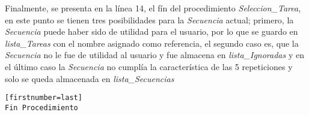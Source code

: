 Finalmente, se presenta en la l\'inea 14, el f\'in del procedimiento
 \emph{Seleccion\_Tarea}, en este punto se tienen tres posibilidades para la 
 \emph{Secuencia} actual; primero, la \emph{Secuencia} puede haber sido de 
 utilidad para el usuario, por lo que se guardo en \emph{lista\_Tareas} con el 
 nombre asignado como referencia, el segundo caso es, que la \emph{Secuencia} 
 no le fue de utilidad al usuario y fue almacena en \emph{lista\_Ignoradas} y 
 en el \'ultimo caso la \emph{Secuencia} no cumpl\'ia la caracter\'istica de 
 las 5 repeticiones y solo se queda almacenada en \emph{lista\_Secuencias}  

\begin{tiny}
\begin{lstlisting}[name=EXseleccion][firstnumber=last]
Fin Procedimiento
\end{lstlisting}
\end{tiny}